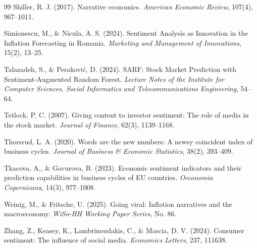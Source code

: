 \documentclass[11pt,twocolumn]{article}
\begin{document}
\begin{thebibliography}{99}
 Shiller, R. J. (2017). Narrative economics. \textit{American Economic Review}, 107(4), 967--1011.

 Simionescu, M., \& Nicula, A. S. (2024). Sentiment Analysis as Innovation in the Inflation Forecasting in Romania. \textit{Marketing and Management of Innovations}, 15(2), 13--25.

 Talazadeh, S., \& Perakovi\'c, D. (2024). SARF: Stock Market Prediction with Sentiment-Augmented Random Forest. \textit{Lecture Notes of the Institute for Computer Sciences, Social Informatics and Telecommunications Engineering}, 54--64.

 Tetlock, P. C. (2007). Giving content to investor sentiment: The role of media in the stock market. \textit{Journal of Finance}, 62(3), 1139--1168.

 Thorsrud, L. A. (2020). Words are the new numbers: A newsy coincident index of business cycles. \textit{Journal of Business \& Economic Statistics}, 38(2), 393--409.

 Tkacova, A., \& Gavurova, B. (2023). Economic sentiment indicators and their prediction capabilities in business cycles of EU countries. \textit{Oeconomia Copernicana}, 14(3), 977--1008.

 Weinig, M., \& Fritsche, U. (2025). Going viral: Inflation narratives and the macroeconomy. \textit{WiSo-HH Working Paper Series}, No. 86.

 Zhang, Z., Keasey, K., Lambrinoudakis, C., \& Mascia, D. V. (2024). Consumer sentiment: The influence of social media. \textit{Economics Letters}, 237, 111638.

\end{thebibliography}
\end{document}
